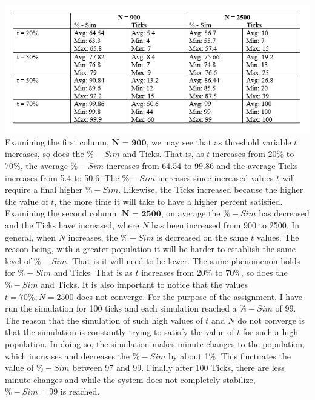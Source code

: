 \documentclass[12pt]{article}
\begin{document}
\section{}
\includegraphics{CSC303Q7.PNG}
\newline
Examining the first column, $\textbf{N = 900}$, we may see that as threshold variable $t$ increases, so does the $\% - Sim$ and Ticks. That is, as $t$ increases from $20\%$ to $70\%$, the average $\%-Sim$ increases from 64.54 to 99.86 and the average Ticks increases from 5.4 to 50.6. The $\%-Sim$ increases since increased values $t$ will require a final higher $\%-Sim$. Likewise, the Ticks increased because the higher the value of $t$, the more time it will take to have a higher percent satisfied. Examining the second column, $\textbf{N = 2500}$, on average the $\%-Sim$ has decreased and the Ticks have increased, where $N$ has been increased from 900 to 2500. In general, when $N$ increases, the $\%-Sim$ is decreased on the same $t$ values. The reason being, with a greater population it will be harder to establish the same level of $\%-Sim$. That is it will need to be lower. The same phenomenon holds for $\%-Sim$ and Ticks. That is as $t$ increases from $20\%$ to $70\%$, so does the $\%-Sim$ and Ticks. It is also important to notice that the values $t = 70\%, N = 2500$ does not converge. For the purpose of the assignment, I have run the simulation for 100 ticks and each simulation reached a $\%-Sim$ of 99. The reason that the simulation of such high values of $t$ and $N$ do not converge is that the simulation is constantly trying to satisfy the value of $t$ for such a high population. In doing so, the simulation makes minute changes to the population, which increases and decreases the $\%-Sim$ by about 1$\%$. This fluctuates the value of $\%-Sim$ between 97 and 99. Finally after 100 Ticks, there are less minute changes and while the system does not completely stabilize, $\%-Sim = 99$ is reached.  
\end{document}
